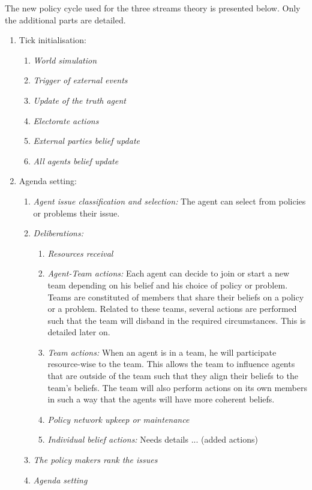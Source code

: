 The new policy cycle used for the three streams theory is presented below. Only the additional parts are detailed.

\begin{enumerate}
\item Tick initialisation:
	\begin{enumerate}
	\item \emph{World simulation}
	\item \emph{Trigger of external events}
	\item \emph{Update of the truth agent}
	\item \emph{Electorate actions}
	\item \emph{External parties belief update}
	\item \emph{All agents belief update}
	\end{enumerate}
\item Agenda setting:
	\begin{enumerate}
	\item \emph{Agent issue classification and selection:} The agent can select from policies or problems their issue.
	\item \emph{Deliberations:}
		\begin{enumerate}
		\item \emph{Resources receival}
		\item \emph{Agent-Team actions:} Each agent can decide to join or start a new team depending on his belief and his choice of policy or problem. Teams are constituted of members that share their beliefs on a policy or a problem. Related to these teams, several actions are performed such that the team will disband in the required circumstances. This is detailed later on.
		\item \emph{Team actions:} When an agent is in a team, he will participate resource-wise to the team. This allows the team to influence agents that are outside of the team such that they align their beliefs to the team's beliefs. The team will also perform actions on its own members in such a way that the agents will have more coherent beliefs. 
		\item \emph{Policy network upkeep or maintenance}
		\item \emph{Individual belief actions:}  Needs details ... (added actions)
		\end{enumerate}
	\item \emph{The policy makers rank the issues}
	\item \emph{Agenda setting}
	\end{enumerate}

\end{enumerate}
